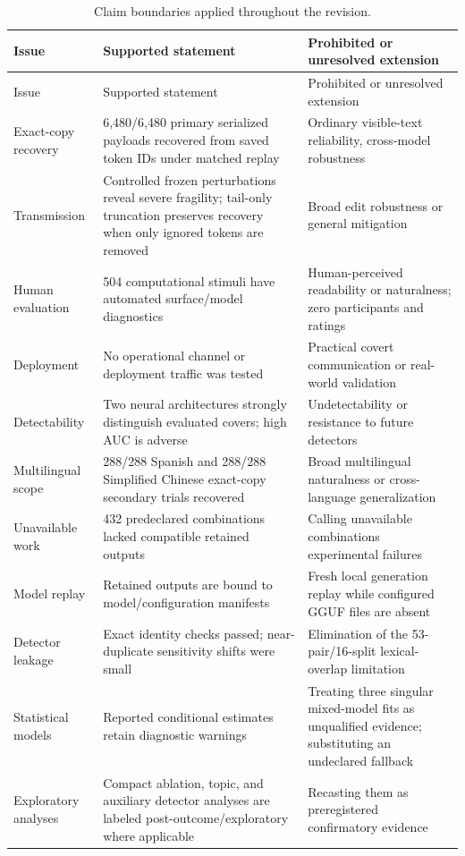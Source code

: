 \documentclass[fleqn,10pt]{wlscirep}
\begin{document}
\begin{longtable}{L{0.25\textwidth}L{0.31\textwidth}L{0.35\textwidth}}
\caption{\label{tab:claim-boundaries}Claim boundaries applied throughout the revision.}\\
\toprule
Issue & Supported statement & Prohibited or unresolved extension \\
\midrule
\endfirsthead
\toprule
Issue & Supported statement & Prohibited or unresolved extension \\
\midrule
\endhead
Exact-copy recovery & 6,480/6,480 primary serialized payloads recovered from saved token IDs under matched replay & Ordinary visible-text reliability, cross-model robustness \\
Transmission & Controlled frozen perturbations reveal severe fragility; tail-only truncation preserves recovery when only ignored tokens are removed & Broad edit robustness or general mitigation \\
Human evaluation & 504 computational stimuli have automated surface/model diagnostics & Human-perceived readability or naturalness; zero participants and ratings \\
Deployment & No operational channel or deployment traffic was tested & Practical covert communication or real-world validation \\
Detectability & Two neural architectures strongly distinguish evaluated covers; high AUC is adverse & Undetectability or resistance to future detectors \\
Multilingual scope & 288/288 Spanish and 288/288 Simplified Chinese exact-copy secondary trials recovered & Broad multilingual naturalness or cross-language generalization \\
Unavailable work & 432 predeclared combinations lacked compatible retained outputs & Calling unavailable combinations experimental failures \\
Model replay & Retained outputs are bound to model/configuration manifests & Fresh local generation replay while configured GGUF files are absent \\
Detector leakage & Exact identity checks passed; near-duplicate sensitivity shifts were small & Elimination of the 53-pair/16-split lexical-overlap limitation \\
Statistical models & Reported conditional estimates retain diagnostic warnings & Treating three singular mixed-model fits as unqualified evidence; substituting an undeclared fallback \\
Exploratory analyses & Compact ablation, topic, and auxiliary detector analyses are labeled post-outcome/exploratory where applicable & Recasting them as preregistered confirmatory evidence \\

\end{longtable}
\end{document}
